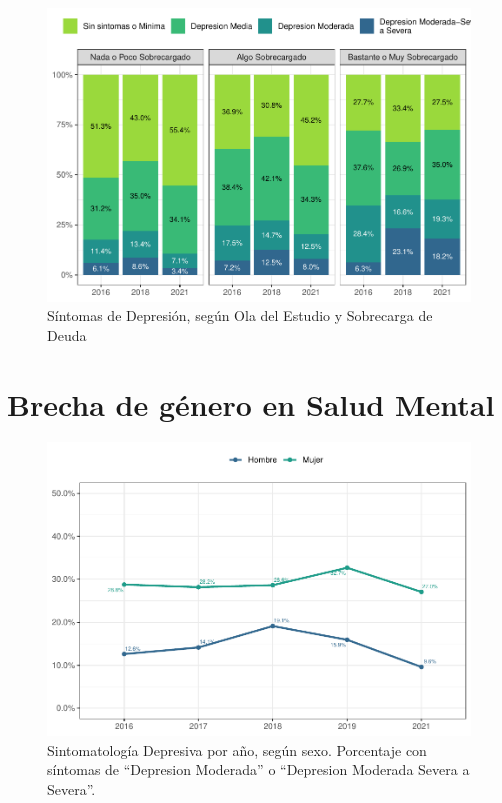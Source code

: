 \documentclass[
  12pt,
  openany]{book}
\begin{document}
\begin{figure}

{\centering \includegraphics{reporte-elsoc_files/figure-latex/depre-deuda-wave-1} 

}

\caption{Síntomas de Depresión, según Ola del Estudio y Sobrecarga de Deuda}\label{fig:depre-deuda-wave}
\end{figure}

\hypertarget{brecha-de-guxe9nero-en-salud-mental}{%
\section{Brecha de género en Salud Mental}\label{brecha-de-guxe9nero-en-salud-mental}}

\begin{figure}

{\centering \includegraphics{reporte-elsoc_files/figure-latex/depre-year-sexo-1} 

}

\caption{Sintomatología Depresiva por año, según sexo. Porcentaje con síntomas de “Depresion Moderada” o “Depresion Moderada Severa a Severa”.}\label{fig:depre-year-sexo}
\end{figure}
\end{document}
